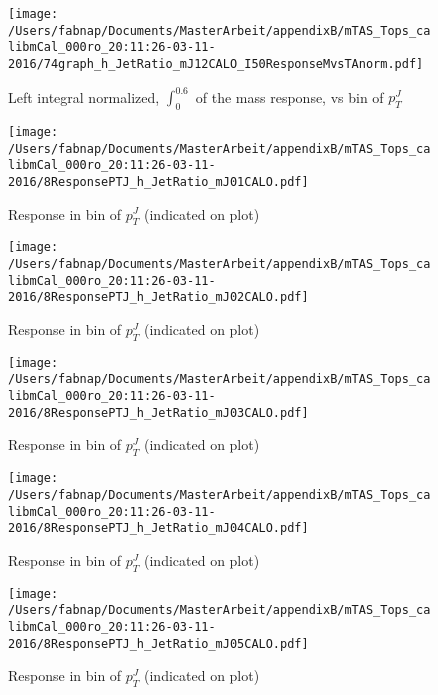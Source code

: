 \begin{figure}

\texttt{[image: /Users/fabnap/Documents/MasterArbeit/appendixB/mTAS\_Tops\_calibmCal\_000ro\_20:11:26-03-11-2016/74graph\_h\_JetRatio\_mJ12CALO\_I50ResponseMvsTAnorm.pdf]}
\caption{Left integral normalized, $\int_{0}^{0.6} $ of the mass response, vs bin of  $p_{T}^{J}$}

\end{figure}
 \clearpage %
\begin{figure}

\texttt{[image: /Users/fabnap/Documents/MasterArbeit/appendixB/mTAS\_Tops\_calibmCal\_000ro\_20:11:26-03-11-2016/8ResponsePTJ\_h\_JetRatio\_mJ01CALO.pdf]}
\caption{Response in bin of  $p_{T}^{J}$ (indicated on plot)} 

\end{figure}

\begin{figure}

\texttt{[image: /Users/fabnap/Documents/MasterArbeit/appendixB/mTAS\_Tops\_calibmCal\_000ro\_20:11:26-03-11-2016/8ResponsePTJ\_h\_JetRatio\_mJ02CALO.pdf]}
\caption{Response in bin of  $p_{T}^{J}$ (indicated on plot)} 

\end{figure}

\begin{figure}

\texttt{[image: /Users/fabnap/Documents/MasterArbeit/appendixB/mTAS\_Tops\_calibmCal\_000ro\_20:11:26-03-11-2016/8ResponsePTJ\_h\_JetRatio\_mJ03CALO.pdf]}
\caption{Response in bin of  $p_{T}^{J}$ (indicated on plot)} 

\end{figure}

\begin{figure}

\texttt{[image: /Users/fabnap/Documents/MasterArbeit/appendixB/mTAS\_Tops\_calibmCal\_000ro\_20:11:26-03-11-2016/8ResponsePTJ\_h\_JetRatio\_mJ04CALO.pdf]}
\caption{Response in bin of  $p_{T}^{J}$ (indicated on plot)} 

\end{figure}

\begin{figure}

\texttt{[image: /Users/fabnap/Documents/MasterArbeit/appendixB/mTAS\_Tops\_calibmCal\_000ro\_20:11:26-03-11-2016/8ResponsePTJ\_h\_JetRatio\_mJ05CALO.pdf]}
\caption{Response in bin of  $p_{T}^{J}$ (indicated on plot)} 

\end{figure}

